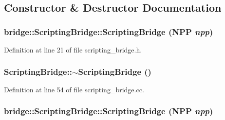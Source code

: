 \subsection{Constructor \& Destructor Documentation}
\hypertarget{classbridge_1_1_scripting_bridge_a9f6cceea3738d76e33f47ba8ad5f72d9}{
\subsubsection[{ScriptingBridge}]{\setlength{\rightskip}{0pt plus 5cm}bridge::ScriptingBridge::ScriptingBridge (NPP {\em npp})}}
\label{classbridge_1_1_scripting_bridge_a9f6cceea3738d76e33f47ba8ad5f72d9}


Definition at line 21 of file scripting\_\-bridge.h.

\hypertarget{classbridge_1_1_scripting_bridge_ae6c311b5f9ffa0a578c7d8e41fa9c23c}{
\subsubsection[{$\sim$ScriptingBridge}]{\setlength{\rightskip}{0pt plus 5cm}ScriptingBridge::$\sim$ScriptingBridge ()}}
\label{classbridge_1_1_scripting_bridge_ae6c311b5f9ffa0a578c7d8e41fa9c23c}


Definition at line 54 of file scripting\_\-bridge.cc.

\hypertarget{classbridge_1_1_scripting_bridge_a9f6cceea3738d76e33f47ba8ad5f72d9}{
\subsubsection[{ScriptingBridge}]{\setlength{\rightskip}{0pt plus 5cm}bridge::ScriptingBridge::ScriptingBridge (NPP {\em npp})}}
\label{classbridge_1_1_scripting_bridge_a9f6cceea3738d76e33f47ba8ad5f72d9}


